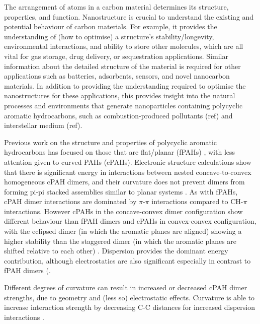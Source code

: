 The arrangement of atoms in a carbon material determines its structure, properties, and function. Nanostructure is crucial to understand the existing and potential behaviour of carbon materials. For example, it provides the understanding of (how to optimise) a structure's stability/longevity, environmental interactions, and ability to store other molecules, which are all vital for gas storage, drug delivery, or sequestration applications.  Similar information about the detailed structure of the material is required for other applications such as batteries, adsorbents, sensors, and novel nanocarbon materials.
In addition to providing the understanding required to optimise the nanostructures for these applications, this provides insight into the natural processes and environments that generate nanoparticles containing polycyclic aromatic hydrocarbons, such as combustion-produced pollutants (ref) and interstellar medium (ref).

Previous work on the structure and properties of polycyclic aromatic hydrocarbons has focused on those that are flat/planar (fPAHs) \cite{Grancic2016,chen2014size,Rapacioli2005stacked,hernandez2017dynamics}, with less attention given to curved PAHs (cPAHs). Electronic structure calculations show that there is significant energy in interactions between nested concave-to-convex homogeneous cPAH dimers, and their curvature does not prevent dimers from forming pi-pi stacked assemblies similar to planar systems \cite{sygula2009pi,Cabaleiro-Lago2018}. As with fPAHs, cPAH dimer interactions are dominated by $\pi$-$\pi$ interactions compared to CH-$\pi$ interactions. However cPAHs in the concave-convex dimer configuration show different behaviour than fPAH dimers and cPAHs in convex-convex configuration, with the eclipsed dimer (in which the aromatic planes are aligned) showing a higher stability than the staggered dimer (in which the aromatic planes are shifted relative to each other) \cite{janowski2011convex,Cabaleiro-Lago2018}.
Dispersion provides the dominant energy contribution, although electrostatics are also significant especially in contrast to fPAH dimers (\cite{Cabaleiro-Lago2018,janowski2011convex}.

Different degrees of curvature can result in increased or decreased cPAH dimer strengths, due to geometry and (less so) electrostatic effects. Curvature is able to increase interaction strength by decreasing C-C distances for increased dispersion interactions \cite{kennedy2012buckyplates}. 

